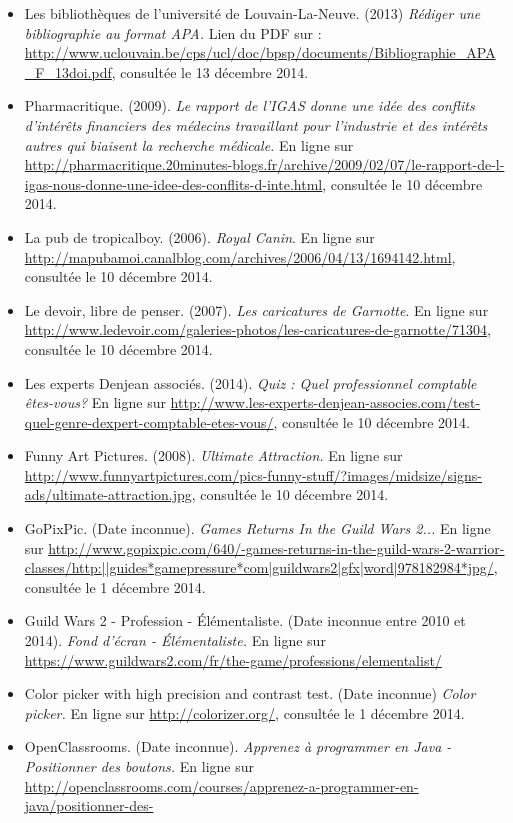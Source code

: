 \documentclass[a4paper,titlepage]{article}
\begin{document}
\begin{itemize}
	\item Les bibliothèques de l'université de Louvain-La-Neuve. (2013) \textit{Rédiger une bibliographie au format APA.} Lien du PDF sur : \url{http://www.uclouvain.be/cps/ucl/doc/bpsp/documents/Bibliographie\_APA\_F\_13doi.pdf},  consultée le 13 décembre 2014.
	\item Pharmacritique. (2009). \textit{Le rapport de l'IGAS donne une idée des conflits d'intérêts financiers des médecins travaillant pour l'industrie et des intérêts autres qui biaisent la recherche médicale.} En ligne sur \url{http://pharmacritique.20minutes-blogs.fr/archive/2009/02/07/le-rapport-de-l-igas-nous-donne-une-idee-des-conflits-d-inte.html}, consultée le 10 décembre 2014.
	\item La pub de tropicalboy. (2006). \textit{Royal Canin}. En ligne sur \url{http://mapubamoi.canalblog.com/archives/2006/04/13/1694142.html}, consultée le 10 décembre 2014.
	\item Le devoir, libre de penser. (2007). \textit{Les caricatures de Garnotte}. En ligne sur \url{http://www.ledevoir.com/galeries-photos/les-caricatures-de-garnotte/71304}, consultée le 10 décembre 2014.
	\item Les experts Denjean associés. (2014). \textit{Quiz : Quel professionnel comptable êtes-vous?} En ligne sur \url{http://www.les-experts-denjean-associes.com/test-quel-genre-dexpert-comptable-etes-vous/}, consultée le 10 décembre 2014.
	\item Funny Art Pictures. (2008). \textit{Ultimate Attraction.} En ligne sur \url{http://www.funnyartpictures.com/pics-funny-stuff/?images/midsize/signs-ads/ultimate-attraction.jpg}, consultée le 10 décembre 2014.
	\item GoPixPic. (Date inconnue). \textit{Games Returns In the Guild Wars 2...} En ligne sur \url{http://www.gopixpic.com/640/-games-returns-in-the-guild-wars-2-warrior-classes/http:||guides*gamepressure*com|guildwars2|gfx|word|978182984*jpg/}, consultée le 1 décembre 2014.
	\item Guild Wars 2 - Profession - Élémentaliste. (Date inconnue entre 2010 et 2014). \textit{Fond d'écran - Élémentaliste.} En ligne sur \url{https://www.guildwars2.com/fr/the-game/professions/elementalist/}
	\item Color picker with high precision and contrast test. (Date inconnue) \textit{Color picker.} En ligne sur \url{http://colorizer.org/}, consultée le 1 décembre 2014.
	\item OpenClassrooms. (Date inconnue). \textit{Apprenez à programmer en Java - Positionner des boutons.} En ligne sur \url{http://openclassrooms.com/courses/apprenez-a-programmer-en-java/positionner-des-
}
\end{itemize}
\end{document}
